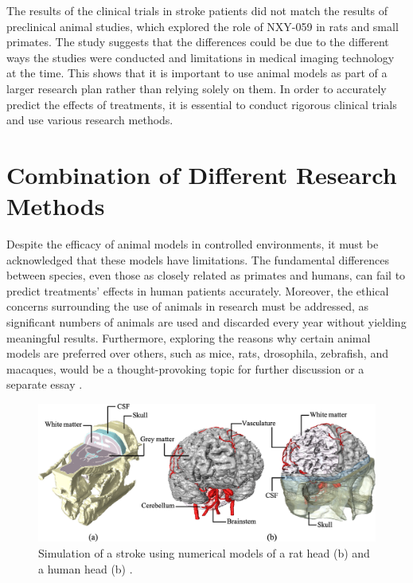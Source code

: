 \documentclass[10pt]{article}
\begin{document}
\begin{sloppypar}
  The results of the clinical trials in stroke patients did not match the results of preclinical animal studies, which explored the role of NXY-059 in rats and small primates. The study suggests that the differences could be due to the different ways the studies were conducted and limitations in medical imaging technology at the time. This shows that it is important to use animal models as part of a larger research plan rather than relying solely on them. In order to accurately predict the effects of treatments, it is essential to conduct rigorous clinical trials and use various research methods.

  \section{Combination of Different Research Methods}
  \label{sec:discussion}

  Despite the efficacy of animal models in controlled environments, it must be acknowledged that these models have limitations. The fundamental differences between species, even those as closely related as primates and humans, can fail to predict treatments’ effects in human patients accurately. Moreover, the ethical concerns surrounding the use of animals in research must be addressed, as significant numbers of animals are used and discarded every year without yielding meaningful results. Furthermore, exploring the reasons why certain animal models are preferred over others, such as mice, rats, drosophila, zebrafish, and macaques, would be a thought-provoking topic for further discussion or a separate essay \citep{govuk_statistics_2022}.

  \vspace{10pt} %
  \begin{figure}[ht]
    \centering
    \includegraphics[width=\textwidth]{figures/in-silico.jpg}
    \caption[Simulation of a stroke using numerical models of a rat head and a human head]{Simulation of a stroke using numerical models of a rat head (b) and a human head (b) \citep{bing_medical_2020}.}
    \label{fig:silico}
  \end{figure}


\end{sloppypar}
\end{document}

